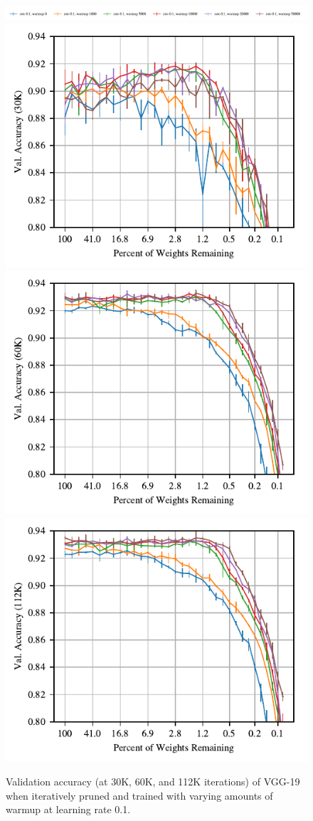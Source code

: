 \begin{figure}
\centering
\vspace{-.5em}
\includegraphics[width=\textwidth]{graphs/cifar10/icml/vgg19-iclr-warmupsweep-30000/legend}
\includegraphics[width=.33\textwidth]{graphs/cifar10/icml/vgg19-iclr-warmupsweep-30000/accuracy}%
\includegraphics[width=.33\textwidth]{graphs/cifar10/icml/vgg19-iclr-warmupsweep-60000/accuracy}%
\includegraphics[width=.33\textwidth]{graphs/cifar10/icml/vgg19-iclr-warmupsweep-112000/accuracy}%
\vspace{-1em}
\caption{Validation accuracy (at 30K, 60K, and 112K iterations) of VGG-19 when iteratively pruned and trained with varying amounts of warmup at learning rate 0.1.}
\label{fig:vgg19-warmup}
\end{figure}